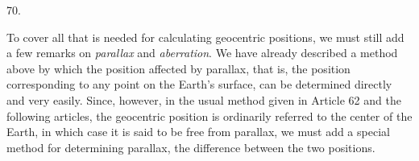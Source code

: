 \par{}\medskip
\hypertarget{native-089-article070}{}
\begin{center}70.\end{center}
To cover all that is needed for calculating geocentric positions, we must still add a few remarks on \emph{parallax} and \emph{aberration}. We have already described a method above by which the position affected by parallax, that is, the position corresponding to any point on the Earth's surface, can be determined directly and very easily. Since, however, in the usual method given in Article 62 and the following articles, the geocentric position is ordinarily referred to the center of the Earth, in which case it is said to be free from parallax, we must add a special method for determining parallax, the difference between the two positions.

